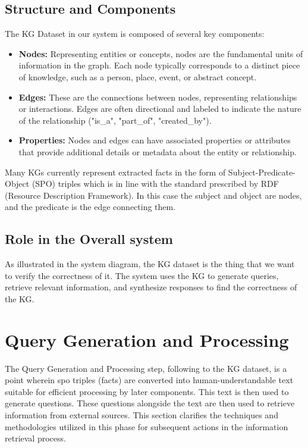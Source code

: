\subsection{Structure and Components}\label{subsec:structure-and-components}
The \ac{KG} Dataset in our system is composed of several key components:
\begin{itemize}
    \item \textbf{Nodes:} Representing entities or concepts, nodes are the fundamental units of information in the graph. Each node typically corresponds to a distinct piece of knowledge, such as a person, place, event, or abstract concept.
    \item \textbf{Edges:} These are the connections between nodes, representing relationships or interactions. Edges are often directional and labeled to indicate the nature of the relationship (\eg "is\_a", "part\_of", "created\_by").
    \item \textbf{Properties:} Nodes and edges can have associated properties or attributes that provide additional details or metadata about the entity or relationship.
\end{itemize}
Many \acp{KG} currently represent extracted facts in the form of Subject-Predicate-Object (SPO) triples which is in line with the standard prescribed by RDF (Resource Description Framework).
In this case the subject and object are nodes, and the predicate is the edge connecting them.

\subsection{Role in the Overall system}\label{subsec:role-in-the-overall-system}
As illustrated in the system diagram, the \ac{KG} dataset is the thing that we want to verify the correctness of it.
The system uses the \ac{KG} to generate queries, retrieve relevant information, and synthesize responses to find the correctness of the \ac{KG}.

\section{Query Generation and Processing}\label{sec:query-generation-and-processing}
The Query Generation and Processing step, following to the \ac{KG} dataset, is a point wherein spo triples (\ie facts) are converted into human-understandable text suitable for efficient processing by later components.
This text is then used to generate questions.
These questions alongside the text are then used to retrieve information from external sources.
This section clarifies the techniques and methodologies utilized in this phase for subsequent actions in the information retrieval process.

